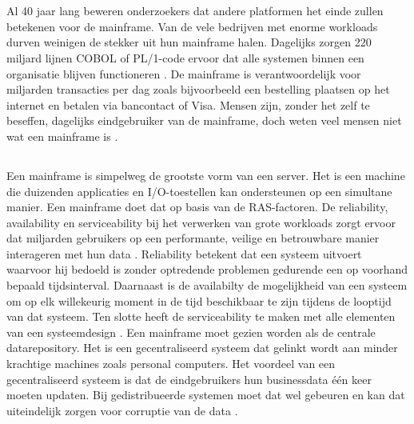 
\chapter{}
\label{ch:inleiding}
Al 40  jaar lang beweren onderzoekers dat andere platformen het einde zullen betekenen voor de mainframe. Van de vele bedrijven met enorme workloads durven weinigen de stekker uit hun mainframe halen. Dagelijks zorgen 220 miljard lijnen COBOL of PL/1-code ervoor dat alle systemen binnen een organisatie blijven functioneren \autocite{Scannell2017}. De mainframe is verantwoordelijk voor miljarden transacties per dag zoals bijvoorbeeld een bestelling plaatsen op het internet en betalen via bancontact of Visa. Mensen zijn, zonder het zelf te beseffen, dagelijks eindgebruiker van de mainframe, doch weten veel mensen niet wat een mainframe is \autocite{Scannell2017}. 

\section{}

Een mainframe is simpelweg de grootste vorm van een server. Het is een machine die duizenden applicaties en I/O-toestellen kan ondersteunen op een simultane manier.  Een mainframe doet dat op basis van de RAS-factoren. De reliability, availability en serviceability bij het verwerken van grote workloads zorgt ervoor dat miljarden gebruikers op een performante, veilige en betrouwbare manier interageren met hun data \autocite{Ebbers2022}. Reliability betekent dat een systeem uitvoert waarvoor hij bedoeld is zonder optredende problemen gedurende een op voorhand bepaald tijdsinterval. Daarnaast is de availabilty de mogelijkheid van een systeem om op elk willekeurig moment in de tijd beschikbaar te zijn tijdens de looptijd van dat systeem. Ten slotte heeft de serviceability te maken met alle elementen van een systeemdesign \autocite{Johnson1988}.  Een mainframe moet gezien worden als de centrale datarepository. Het is een gecentraliseerd systeem dat gelinkt wordt aan minder krachtige machines zoals personal computers.  Het voordeel van een gecentraliseerd systeem is dat de eindgebruikers hun businessdata één keer moeten updaten. Bij gedistribueerde systemen moet dat wel gebeuren en kan dat uiteindelijk zorgen voor corruptie van de data \autocite{Ebbers2022}. 

